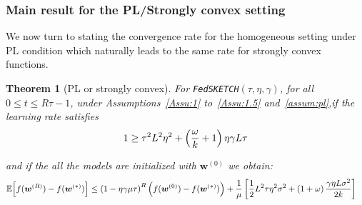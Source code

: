\documentclass{article}
\newtheorem{theorem}{Theorem}
\begin{document}
\subsubsection{Main result for the PL/Strongly convex setting}
 
We now turn to stating the convergence rate for the homogeneous setting under PL condition which naturally leads to the same rate for strongly convex functions.
\begin{theorem}[PL or strongly convex]\label{thm:pl-iid}
For \texttt{FedSKETCH}$(\tau, \eta, \gamma)$, for all $0\leq t\leq R\tau-1$,  under Assumptions~\ref{Assu:1} to~\ref{Assu:1.5} and~\ref{assum:pl},if the learning rate satisfies 
\begin{align}\notag
   1\geq {\tau^2 L^2\eta^2}+\left(\frac{\omega}{k}+1\right){\eta\gamma L}{\tau} 
\end{align}

and if the all the models are initialized with $\boldsymbol{w}^{(0)}$ we obtain:
\begin{align}\notag
        \mathbb{E}\Big[f({\boldsymbol{w}}^{(R)})-f({\boldsymbol{w}}^{(*)})\Big]&\leq \left(1-\eta\gamma{\mu\tau}\right)^R\left(f(\boldsymbol{w}^{(0)})-f(\boldsymbol{w}^{(*)})\right)+\frac{1}{{\mu}}\left[\frac{1}{2} L^2\tau\eta^2\sigma^2+\left(1+\omega\right)\frac{\gamma\eta L\sigma^2}{2k}\right]
\end{align}
\end{theorem}
\end{document}
